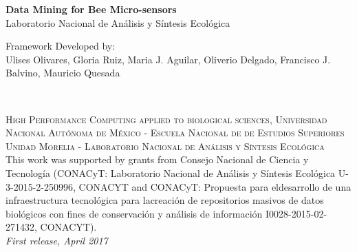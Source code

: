 \documentclass[11pt,fleqn]{book} %
\begin{document}

\begingroup
\thispagestyle{empty}
\centering
\vspace*{4cm}
\par\normalfont\fontsize{35}{35}\sffamily\selectfont
\textbf{\color{white}Data Mining for Bee Micro-sensors}\\
{\Huge\color{white} Laboratorio Nacional de Análisis y Síntesis Ecológica}\par %
\vspace*{0.2cm}
{\LARGE\color{white} Framework Developed by:\\ Ulises Olivares, Gloria Ruiz, Maria J. Aguilar, Oliverio Delgado, Francisco J. Balvino, Mauricio Quesada }\par %
\endgroup


\newpage
~\vfill
\thispagestyle{empty}


\noindent \textsc{High Performance Computing applied to biological sciences, Universidad Nacional Autónoma de México - Escuela Nacional de de Estudios Superiores Unidad Morelia - Laboratorio Nacional de Análisis y Síntesis Ecológica }\\

\noindent  This work was supported by grants from Consejo Nacional de Ciencia y Tecnología (CONACyT: Laboratorio Nacional de Análisis y Síntesis Ecológica U-3-2015-2-250996, CONACYT and CONACyT: Propuesta para eldesarrollo de una infraestructura tecnológica para lacreación de repositorios masivos de datos biológicos con fines de conservación y análisis de información I0028-2015-02-271432, CONACYT).\\ %

\noindent \textit{First release, April 2017} %
\end{document}
